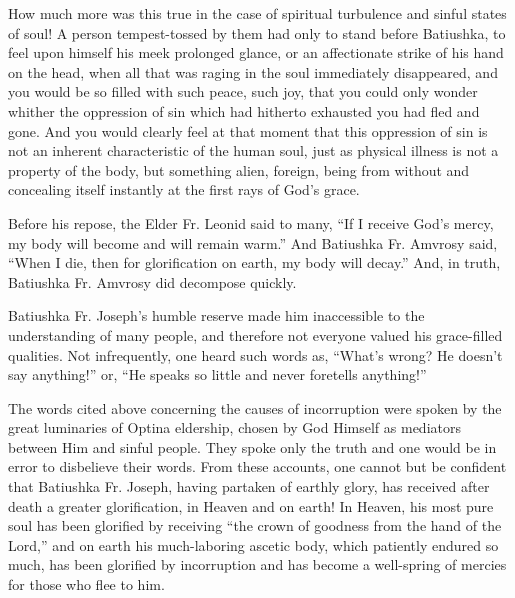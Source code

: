 How much more was this true in the case of spiritual turbulence and sinful states of soul! A person tempest-tossed by them had only to stand before Batiushka, to feel upon himself his meek prolonged glance, or an affectionate strike of his hand on the head, when all that was raging in the soul immediately disappeared, and you would be so filled with such peace, such joy, that you could only wonder whither the oppression of sin which had hitherto exhausted you had fled and gone. And you would clearly feel at that moment that this oppression of sin is not an inherent characteristic of the human soul, just as physical illness is not a property of the body, but something alien, foreign, being from without and concealing itself instantly at the first rays of God's grace.

Before his repose, the Elder Fr. Leonid said to many, ``If I receive God's mercy, my body will become and will remain warm.'' And Batiushka Fr. Amvrosy said, ``When I die, then for glorification on earth, my body will decay.'' And, in truth, Batiushka Fr. Amvrosy did decompose quickly.

Batiushka Fr. Joseph's humble reserve made him inaccessible to the understanding of many people, and therefore not everyone valued his grace-filled qualities. Not infrequently, one heard such words as, ``What's wrong? He doesn't say anything!'' or, ``He speaks so little and never foretells anything!''

The words cited above concerning the causes of incorruption were spoken by the great luminaries of Optina eldership, chosen by God Himself as mediators between Him and sinful people. They spoke only the truth and one would be in error to disbelieve their words. From these accounts, one cannot but be confident that Batiushka Fr. Joseph, having partaken of earthly glory, has received after death a greater glorification, in Heaven and on earth! In Heaven, his most pure soul has been glorified by receiving ``the crown of goodness from the hand of the Lord,'' and on earth his much-laboring ascetic body, which patiently endured so much, has been glorified by incorruption and has become a well-spring of mercies for those who flee to him.

